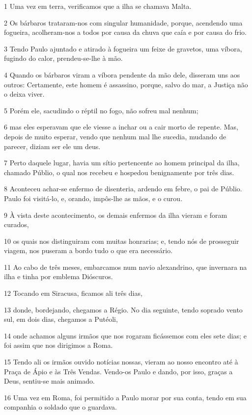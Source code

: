 \par 1 Uma vez em terra, verificamos que a ilha se chamava Malta.
\par 2 Os bárbaros trataram-nos com singular humanidade, porque, acendendo uma fogueira, acolheram-nos a todos por causa da chuva que caía e por causa do frio.
\par 3 Tendo Paulo ajuntado e atirado à fogueira um feixe de gravetos, uma víbora, fugindo do calor, prendeu-se-lhe à mão.
\par 4 Quando os bárbaros viram a víbora pendente da mão dele, disseram uns aos outros: Certamente, este homem é assassino, porque, salvo do mar, a Justiça não o deixa viver.
\par 5 Porém ele, sacudindo o réptil no fogo, não sofreu mal nenhum;
\par 6 mas eles esperavam que ele viesse a inchar ou a cair morto de repente. Mas, depois de muito esperar, vendo que nenhum mal lhe sucedia, mudando de parecer, diziam ser ele um deus.
\par 7 Perto daquele lugar, havia um sítio pertencente ao homem principal da ilha, chamado Públio, o qual nos recebeu e hospedou benignamente por três dias.
\par 8 Aconteceu achar-se enfermo de disenteria, ardendo em febre, o pai de Públio. Paulo foi visitá-lo, e, orando, impôs-lhe as mãos, e o curou.
\par 9 À vista deste acontecimento, os demais enfermos da ilha vieram e foram curados,
\par 10 os quais nos distinguiram com muitas honrarias; e, tendo nós de prosseguir viagem, nos puseram a bordo tudo o que era necessário.
\par 11 Ao cabo de três meses, embarcamos num navio alexandrino, que invernara na ilha e tinha por emblema Dióscuros.
\par 12 Tocando em Siracusa, ficamos ali três dias,
\par 13 donde, bordejando, chegamos a Régio. No dia seguinte, tendo soprado vento sul, em dois dias, chegamos a Putéoli,
\par 14 onde achamos alguns irmãos que nos rogaram ficássemos com eles sete dias; e foi assim que nos dirigimos a Roma.
\par 15 Tendo ali os irmãos ouvido notícias nossas, vieram ao nosso encontro até à Praça de Ápio e às Três Vendas. Vendo-os Paulo e dando, por isso, graças a Deus, sentiu-se mais animado.
\par 16 Uma vez em Roma, foi permitido a Paulo morar por sua conta, tendo em sua companhia o soldado que o guardava.
